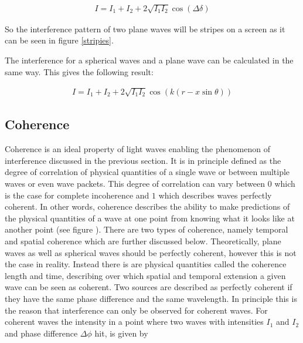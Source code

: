 \begin{align}
I=I_1+I_2 +2 \sqrt{I_1I_2}\cos(\Delta \delta) \label{Intensity}
\end{align}

So the interference pattern of two plane waves will be stripes on a screen as it can be seen in figure \ref{stripies}. \cite{staats}


The interference for a spherical waves and a plane wave can be calculated in the same way. This gives the following result:

\begin{align}
I=I_1+I_2+2\sqrt{I_1I_2}\cos(k(r-x\sin\theta))
\end{align}



\subsection{Coherence \label{Coherence section}}

Coherence is an ideal property of light waves enabling the phenomenon of interference discussed in the previous section. It is in principle defined as the degree of correlation of physical quantities of a single wave or between multiple waves or even wave packets. This degree of correlation can vary between $0$ which is the case for complete incoherence and $1$ which describes waves perfectly coherent. In other words, coherence describes the ability to make predictions of the physical quantities of a wave at one point from knowing what it looks like at another point (see figure ). There are two types of coherence, namely temporal and spatial coherence which are further discussed below. Theoretically, plane waves as well as spherical waves should be perfectly coherent, however this is not the case in reality. Instead there is are physical quantities called the coherence length and time, describing over which spatial and temporal extension a given wave can be seen as coherent. Two sources are described as perfectly coherent if they have the same phase difference and the same wavelength. In principle this is the reason that interference can only be observed for coherent waves. For coherent waves the intensity in a point where two waves with intensities $I_1$ and $I_2$ and phase difference $\Delta \phi$ hit, is given by

